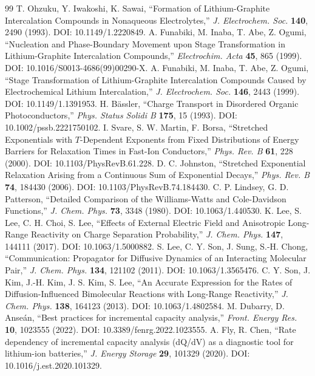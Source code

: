 \documentclass[11pt,a4paper]{article}
\begin{document}
\begin{thebibliography}{99}
 T. Ohzuku, Y. Iwakoshi, K. Sawai, ``Formation of Lithium-Graphite Intercalation Compounds in Nonaqueous Electrolytes,''
  \emph{J. Electrochem. Soc.} \textbf{140}, 2490 (1993). DOI: 10.1149/1.2220849.
 A. Funabiki, M. Inaba, T. Abe, Z. Ogumi, ``Nucleation and Phase-Boundary
  Movement upon Stage Transformation in Lithium-Graphite Intercalation Compounds,''
  \emph{Electrochim. Acta} \textbf{45}, 865 (1999). DOI: 10.1016/S0013-4686(99)00290-X.
 A. Funabiki, M. Inaba, T. Abe, Z. Ogumi, ``Stage Transformation of
  Lithium-Graphite Intercalation Compounds Caused by Electrochemical Lithium Intercalation,''
  \emph{J. Electrochem. Soc.} \textbf{146}, 2443 (1999). DOI: 10.1149/1.1391953.
 H. B\"assler, ``Charge Transport in Disordered Organic Photoconductors,''
  \emph{Phys. Status Solidi B} \textbf{175}, 15 (1993). DOI: 10.1002/pssb.2221750102.
 I. Svare, S. W. Martin, F. Borsa, ``Stretched Exponentials with $T$-Dependent
  Exponents from Fixed Distributions of Energy Barriers for Relaxation Times in Fast-Ion Conductors,''
  \emph{Phys. Rev. B} \textbf{61}, 228 (2000). DOI: 10.1103/PhysRevB.61.228.
 D. C. Johnston, ``Stretched Exponential Relaxation Arising from a Continuous Sum
  of Exponential Decays,'' \emph{Phys. Rev. B} \textbf{74}, 184430 (2006). DOI: 10.1103/PhysRevB.74.184430.
 C. P. Lindsey, G. D. Patterson, ``Detailed Comparison of the Williams-Watts and
  Cole-Davidson Functions,'' \emph{J. Chem. Phys.} \textbf{73}, 3348 (1980). DOI: 10.1063/1.440530.
 K. Lee, S. Lee, C. H. Choi, S. Lee, ``Effects of External Electric Field and Anisotropic Long-Range Reactivity on Charge Separation Probability,''
  \emph{J. Chem. Phys.} \textbf{147}, 144111 (2017). DOI: 10.1063/1.5000882.
 S. Lee, C. Y. Son, J. Sung, S.-H. Chong, ``Communication: Propagator for Diffusive Dynamics of an Interacting Molecular Pair,''
  \emph{J. Chem. Phys.} \textbf{134}, 121102 (2011). DOI: 10.1063/1.3565476.
 C. Y. Son, J. Kim, J.-H. Kim, J. S. Kim, S. Lee, ``An Accurate Expression for the Rates of Diffusion-Influenced Bimolecular Reactions with Long-Range Reactivity,''
  \emph{J. Chem. Phys.} \textbf{138}, 164123 (2013). DOI: 10.1063/1.4802584.
 M. Dubarry, D. Anseán, ``Best practices for incremental capacity analysis,''
  \emph{Front. Energy Res.} \textbf{10}, 1023555 (2022). DOI: 10.3389/fenrg.2022.1023555.
 A. Fly, R. Chen, ``Rate dependency of incremental capacity analysis (dQ/dV) as a diagnostic tool for lithium-ion batteries,''
  \emph{J. Energy Storage} \textbf{29}, 101329 (2020). DOI: 10.1016/j.est.2020.101329.
\end{thebibliography}
\end{document}

